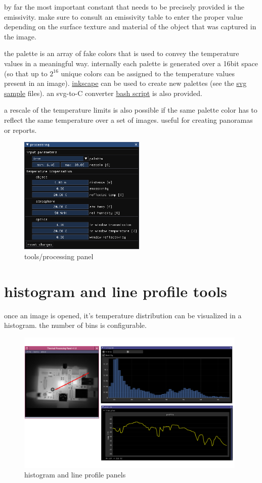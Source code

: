 \documentclass[12pt,twoside,a4paper,notitlepage]{report}
\begin{document}
by far the most important constant that needs to be precisely provided is the emissivity. make sure to consult an emissivity table to enter the proper value depending on the surface texture and material of the object that was captured in the image.

the palette is an array of fake colors that is used to convey the temperature values in a meaningful way. internally each palette is generated over a 16bit space (so that up to $2^{16}$ unique colors can be assigned to the temperature values present in an image). \href{https://inkscape.org/}{inkscape} can be used to create new palettes (see the \href{https://github.com/rodan/thpp/blob/main/palette/hmetal2.svg}{svg sample} files). an svg-to-C converter \href{https://github.com/rodan/thpp/blob/main/palette/extract_pal.sh}{bash script} is also provided.

a rescale of the temperature limits is also possible if the same palette color has to reflect the same temperature over a set of images. useful for creating panoramas or reports.


\begin{figure}[ht]
 \centering
 \includegraphics[width=6cm, keepaspectratio=true]{img/tools_processing}
 \caption{tools/processing panel}
 \label{fig:tools-processing}
\end{figure}

\section{histogram and line profile tools} \label{sec:tools-histogram}

once an image is opened, it's temperature distribution can be visualized in a histogram. the number of bins is configurable.

\begin{figure}[ht]
 \centering
 \includegraphics[width=11cm, keepaspectratio=true]{img/tools_histogram}
 \caption{histogram and line profile panels}
 \label{fig:tools-histogram}
\end{figure}
\end{document}
